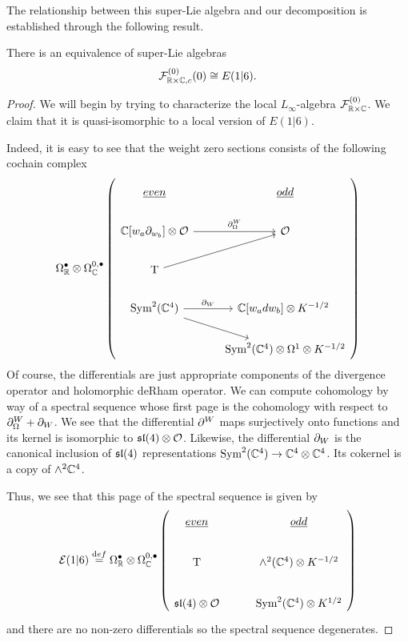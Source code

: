 The relationship between this super-Lie algebra and our decomposition is established through the following result.

\begin{prop}
There is an equivalence of super-Lie algebras
\[
\mathcal{F}^{(0)}_{\mathbb{R}\times \mathbb{C}, c}  (0) \cong E(1|6).
\]
\end{prop}
\begin{proof}
We will begin by trying to characterize the local $L_\infty$-algebra $\mathcal{F}^{(0)}_{\mathbb{R}\times \mathbb{C}}$. We claim that it is quasi-isomorphic to a local version of $E(1|6)$. 

Indeed, it is easy to see that the weight zero sections consists of the following cochain complex 
\begin{equation}
\Omega^\bullet _\R \otimes \Omega^{0,\bullet}_\C \left (
\begin{tikzcd}
\ul{even} & \ul{odd} \\
\C[w_a\del_{w_b}]\otimes \mc O\ar[r, "\del^W_\Omega"]  & \mc O \\ 
\T \ar[ur] & \\
\Sym^2 (\C^4)\ar[r, "\del_W"]\ar[dr] & \C[w_adw_b] \otimes K^{-1/2}\ \\
& \Sym^2 (\C^4)\otimes \Omega^1\otimes K^{-1/2}
\end{tikzcd} \right)
\end{equation}
Of course, the differentials are just appropriate components of the divergence operator and holomorphic deRham operator. We can compute cohomology by way of a spectral sequence whose first page is the cohomology with respect to $\partial^W_\Omega + \partial_W$. We see that the differential $\partial^W$ maps surjectively onto functions and its kernel is isomorphic to $\mathfrak{sl}(4)\otimes \mathcal{O}$. Likewise, the differential $\partial_W$ is the canonical inclusion of $\mathfrak{sl}(4)$ representations $\text{Sym}^2 (\mathbb{C}^4)\to \mathbb{C}^4\otimes \mathbb{C}^4$. Its cokernel is a copy of $\wedge^2 \mathbb{C}^4$. 

Thus, we see that this page of the spectral sequence is given by
\begin{equation}
\mc E(1|6) \define \Omega^\bullet _\R \otimes \Omega^{0,\bullet}_\C \left (
\begin{tikzcd}
\ul{even} & \ul{odd} \\
\T & \wedge^2 (\C^4) \otimes K^{-1/2} \\
\mf {sl}(4)\otimes \mc O & \Sym^2 (\C^4)\otimes K^{1/2}
\end{tikzcd} \right)
\end{equation}
and there are no non-zero differentials so the spectral sequence degenerates.


\end{proof}

